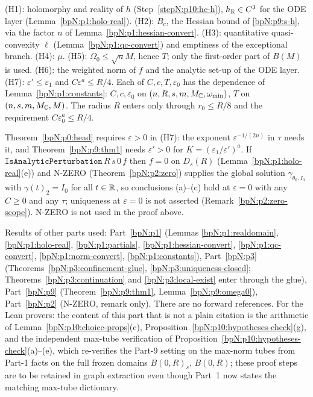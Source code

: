 \begin{remark}\label{bpN:p10:audit}
(H1): holomorphy and reality of $h$ (Step~\ref{stepN:p10:hc-h}), $h_{\mathbb{R}}\in C^3$ for the ODE layer (Lemma~\ref{bpN:p1:holo-real}). (H2): $B_c$, the Hessian bound of \ref{bpN:p9:s-h}, via the factor $n$ of Lemma~\ref{bpN:p1:hessian-convert}. (H3): quantitative quasi-convexity $\ell$ (Lemma~\ref{bpN:p1:qc-convert}) and emptiness of the exceptional branch. (H4): $\mu$. (H5): $\Omega_0\le\sqrt nM$, hence $T$; only the first-order part of $B(M)$ is used. (H6): the weighted norm of $f$ and the analytic set-up of the ODE layer. (H7): $\varepsilon'\le\varepsilon_1$ and $C\varepsilon^a\le R/4$. Each of $C,c,T,\varepsilon_0$ has the dependence of Lemma~\ref{bpN:p1:constants}: $C,c,\varepsilon_0$ on $(n,R,s,m,M_{\mathbb{C}},\omega_{\min})$, $T$ on $(n,s,m,M_{\mathbb{C}},M)$. The radius $R$ enters only through $r_0\le R/8$ and the requirement $C\varepsilon_0^a\le R/4$.
\end{remark}

\begin{remark}[The case $\varepsilon=0$; consistency with N-ZERO]\label{bpN:p10:zero-case}
Theorem~\ref{bpN:p0:head} requires $\varepsilon>0$ in (H7): the exponent $\varepsilon^{-1/(2n)}$ in $\tau$ needs it, and Theorem~\ref{bpN:p9:thm1} needs $\varepsilon'>0$ for $K=(\varepsilon_1/\varepsilon')^a$. If $\texttt{IsAnalyticPerturbation}\,R\,s\,0\,f$ then $f=0$ on $D_s(R)$ (Lemma~\ref{bpN:p1:holo-real}(e)) and N-ZERO (Theorem~\ref{bpN:p2:zero}) supplies the global solution $\gamma_{\theta_0,I_0}$ with $\gamma(t)_2=I_0$ for all $t\in\mathbb{R}$, so conclusions (a)--(c) hold at $\varepsilon=0$ with any $C\ge0$ and any $\tau$; uniqueness at $\varepsilon=0$ is not asserted (Remark~\ref{bpN:p2:zero-scope}). N-ZERO is not used in the proof above.
\end{remark}

\begin{remark}\label{bpN:p10:interfaces}
Results of other parts used: Part~\ref{bpN:p1} (Lemmas \ref{bpN:p1:realdomain}, \ref{bpN:p1:holo-real}, \ref{bpN:p1:partials}, \ref{bpN:p1:hessian-convert}, \ref{bpN:p1:qc-convert}, \ref{bpN:p1:norm-convert}, \ref{bpN:p1:constants}), Part~\ref{bpN:p3} (Theorems~\ref{bpN:p3:confinement-glue}, \ref{bpN:p3:uniqueness-closed}; Theorems~\ref{bpN:p3:continuation} and \ref{bpN:p3:local-exist} enter through the glue), Part~\ref{bpN:p9} (Theorem~\ref{bpN:p9:thm1}, Lemma~\ref{bpN:p9:omega0}), Part~\ref{bpN:p2} (N-ZERO, remark only). There are no forward references. For the Lean provers: the content of this part that is not a plain citation is the arithmetic of Lemma~\ref{bpN:p10:choice-props}(c), Proposition~\ref{bpN:p10:hypotheses-check}(g), and the independent max-tube verification of Proposition~\ref{bpN:p10:hypotheses-check}(a)--(e), which re-verifies the Part-9 setting on the max-norm tubes from Part-1 facts on the full frozen domains $B(0,R)_s$, $B(0,R)$; these proof steps are to be retained in graph extraction even though Part~1 now states the matching max-tube dictionary.
\end{remark}
\endgroup
